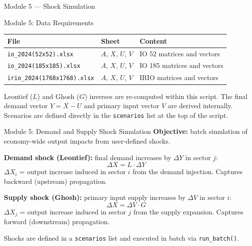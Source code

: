 \documentclass[aspectratio=169]{beamer}
\begin{document}
\begin{frame}{Module 5 --- Shock Simulation}
\tableofcontents[currentsection]
\end{frame}

\begin{frame}{Module 5: Data Requirements}
\begin{center}
\renewcommand{\arraystretch}{1.2}
\begin{tabular}{lll}
\toprule
\textbf{File} & \textbf{Sheet} & \textbf{Content} \\
\midrule
\texttt{io\_2024(52x52).xlsx}       & $A$, $X$, $U$, $V$ & IO 52 matrices and vectors \\
\texttt{io\_2024(185x185).xlsx}     & $A$, $X$, $U$, $V$ & IO 185 matrices and vectors \\
\texttt{irio\_2024(1768x1768).xlsx} & $A$, $X$, $U$, $V$ & IRIO matrices and vectors \\
\bottomrule
\end{tabular}
\end{center}

\medskip
Leontief ($L$) and Ghosh ($G$) inverses are re-computed within this script. The final demand vector $Y = X - U$ and primary input vector $V$ are derived internally. Scenarios are defined directly in the \texttt{scenarios} list at the top of the script.
\end{frame}

\begin{frame}{Module 5: Demand and Supply Shock Simulation}
\textbf{Objective:} batch simulation of economy-wide output impacts from user-defined shocks.

\medskip
\textbf{Demand shock (Leontief):} final demand increases by $\Delta Y$ in sector $j$:
\[
\Delta X = L \cdot \Delta Y
\]
$\Delta X_i$ = output increase induced in sector $i$ from the demand injection. Captures backward (upstream) propagation.

\medskip
\textbf{Supply shock (Ghosh):} primary input supply increases by $\Delta V$ in sector $i$:
\[
\Delta X = \Delta V \cdot G
\]
$\Delta X_j$ = output increase induced in sector $j$ from the supply expansion. Captures forward (downstream) propagation.

\medskip
Shocks are defined in a \texttt{scenarios} list and executed in batch via \texttt{run\_batch()}.
\end{frame}
\end{document}
